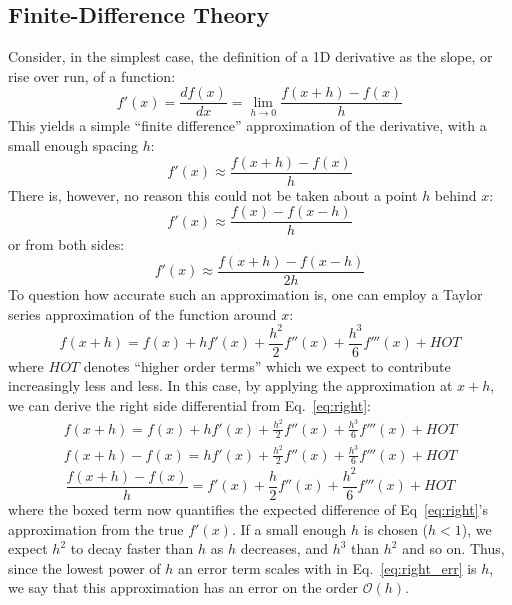 \documentclass[12pt]{article}
\newcommand{\bigO}{\mathcal{O}}
\begin{document}
\subsection{Finite-Difference Theory}
Consider, in the simplest case, the definition of a 1D derivative as the slope, or rise over run, of a function:
\begin{equation}
    \label{eq:lim-h}
    f'(x)=\frac{df(x)}{dx}=\lim_{h\rightarrow0}\frac{f(x+h)-f(x)}{h}
\end{equation}
This yields a simple ``finite difference'' approximation of the derivative, with a small enough spacing $h$:
\begin{equation}\label{eq:right}
    f'(x)\approx\frac{f(x+h)-f(x)}{h}
\end{equation}
There is, however, no reason this could not be taken about a point $h$ behind $x$:
\begin{equation}
    f'(x)\approx\frac{f(x)-f(x-h)}{h}
\end{equation}
or from both sides:
\begin{equation}\label{eq:central}
    f'(x)\approx\frac{f(x+h)-f(x-h)}{2h}
\end{equation}
To question how accurate such an approximation is, one can employ a Taylor series approximation of the function around $x$:
\begin{equation}
    f(x+h)=f(x)+hf'(x)+\frac{h^2}{2}f''(x)+\frac{h^3}{6}f'''(x)+HOT
\end{equation}
where $HOT$ denotes ``higher order terms'' which we expect to contribute increasingly less and less.
In this case, by applying the approximation at $x+h$, we can derive the right side differential from Eq.~\ref{eq:right}:
\begin{gather*}
    f(x+h)=f(x)+hf'(x)+\frac{h^2}{2}f''(x)+\frac{h^3}{6}f'''(x)+HOT \\
    f(x+h)-f(x)=hf'(x)+\frac{h^2}{2}f''(x)+\frac{h^3}{6}f'''(x)+HOT
\end{gather*}
\begin{equation}\label{eq:right_err}
    \frac{f(x+h)-f(x)}{h}=f'(x)+\boxed{\frac{h}{2}f''(x)+\frac{h^2}{6}f'''(x)+HOT}
\end{equation}
where the boxed term now quantifies the expected difference of Eq~\ref{eq:right}'s approximation from the true $f'(x)$.
If a small enough $h$ is chosen ($h<1$), we expect $h^2$ to decay faster than $h$ as $h$ decreases, and $h^3$ than $h^2$ and so on.
Thus, since the lowest power of $h$ an error term scales with in Eq.~\ref{eq:right_err} is $h$, we say that this approximation has an error on the order $\bigO(h)$.\\
\end{document}
